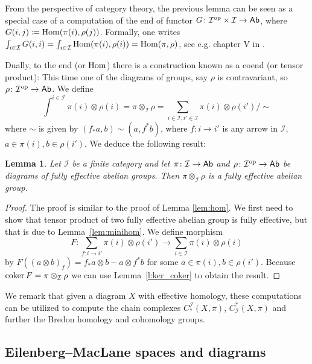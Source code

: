 \documentclass[12pt,a4wide]{article}
\theoremstyle{plain}
\newtheorem{lem}[thm]{Lemma}
\theoremstyle{definition}
\renewcommand\:{\colon}
\def\ot{\otimes}
\newcommand{\dX}{X}
\newcommand{\dpi}{\pi}
\newcommand{\drho}{\rho}
\newcommand{\icat}{\mathcal I}
\begin{document}
From the perspective of category theory, the previous lemma can be seen as a special case of a computation of the end of functor $G\: \icat^\op \times \icat \to \Ab$, where $G(i,j)\coloneqq \Hom(\dpi(i),\drho(j))$.  Formally, one writes $\int_{i\in \icat} G(i,i) = \int_{i\in \icat} \Hom(\dpi(i),\drho(i)) = \Hom(\dpi,\drho)$, see e.g. chapter V in \cite{alaska}.

Dually, to the end (or $\mathop\mathrm{Hom}\nolimits$) there is a construction known as a coend (or tensor product): This time one of the diagrams of groups, say $\drho$ is contravariant, so 
$ \drho \: \icat^\op \to \Ab$. We define 
\begin{equation}\label{eq:coend}
\int^{i\in \icat} \dpi(i) \otimes \drho(i) = \dpi \otimes_\icat \drho =\sum_{i\in \icat, i'\in \icat} \dpi(i) \otimes \drho(i') / \sim
\end{equation}
where $\sim$ is given by ${(f_* a, b)} \sim {(a, f^* b)}$, where $f\:i \to i'$ is any arrow in $\icat$, $a \in \dpi(i), b\in \drho(i')$. We deduce the following result:

\begin{lem}\label{lem:tens}
Let $\icat$ be a finite category and let $\dpi \: \icat \to \Ab$ and $ \drho \: \icat^\op \to \Ab$ be diagrams of fully effective abelian groups. Then $\dpi \otimes_\icat \drho$ is a fully effective abelian group.
\end{lem}
\begin{proof}
The proof is similar to the proof of Lemma \ref{lem:hom}. We first need to show that tensor product of two fully effective abelian group is fully effective, but that is due to Lemma~\ref{lem:minihom}. We define morphism
\[
F \: \sum_{f\colon i\to i'} {\dpi(i) \ot \drho (i')} \to \sum_{ i \in \icat} \dpi(i) \ot \drho (i)
\]
by $F( (a \ot b)_f) = f_* a \ot b - a \ot f^*b $ for some $a \in \dpi(i), b \in  \drho(i')$. Because $\coker F = \dpi \otimes_\icat \drho $ we can use Lemma~\ref{l:ker_coker} to obtain the result.
\end{proof}

We remark that given a diagram $\dX$ with effective homology, these computations can be utilized to compute the chain complexes $C^\icat _* (\dX, \dpi)$, $C_\icat ^* (\dX, \dpi)$ and further the Bredon homology and cohomology groups.

\subsection{Eilenberg--MacLane spaces and diagrams}\label{s:emlspaces}
\end{document}
